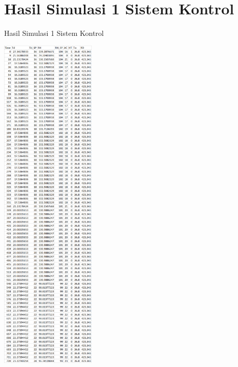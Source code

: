 \section{Hasil Simulasi 1 Sistem Kontrol}
\begin{table}[!h]
	\caption{Hasil Simulasi 1 Sistem Kontrol}
	\label{tbl:A:HasilSimulasiKontrol1}
	\centering
	\includegraphics[width=0.34\textwidth]{figures/HasilSimulasiSimulink1}
\end{table}
\break

